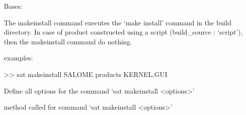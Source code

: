 \documentclass[a4paper,10pt,english]{sphinxmanual}
\begin{document}
\begin{fulllineitems}
\label{\detokenize{apidoc_commands/commands:commands.makeinstall.Command}}
Bases: 

The makeinstall command executes the ‘make install’ command in the build directory.
In case of product constructed using a script (build\_source : ‘script’), 
then the makeinstall command do nothing.

\begin{DUlineblock}{0em}
\item[] examples:
\item[] \textgreater{}\textgreater{} sat makeinstall SALOME \textendash{}products KERNEL,GUI
\end{DUlineblock}

\begin{fulllineitems}
\label{\detokenize{apidoc_commands/commands:commands.makeinstall.Command.getParser}}
Define all options for the command ‘sat makeinstall \textless{}options\textgreater{}’

\end{fulllineitems}


\begin{fulllineitems}
\label{\detokenize{apidoc_commands/commands:commands.makeinstall.Command.name}}
\end{fulllineitems}


\begin{fulllineitems}
\label{\detokenize{apidoc_commands/commands:commands.makeinstall.Command.run}}
method called for command ‘sat makeinstall \textless{}options\textgreater{}’

\end{fulllineitems}


\end{fulllineitems}
\end{document}

